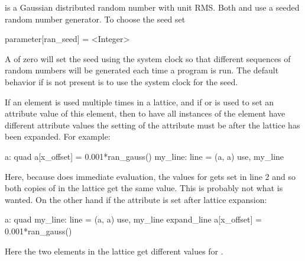  is a Gaussian distributed random number with unit RMS. 
Both  and  use a seeded random number generator. 
To choose the seed set 
\begin{example}
  parameter[ran_seed] = <Integer>
\end{example}
A  of zero will set the seed using the system clock so that
different sequences of random numbers will be generated each time a
program is run.  The default behavior if  is
not present is to use the system clock for the seed.

If an element is used multiple times in a lattice, and if  or
 is used to set an attribute value of this element, then
to have all instances of the element have different attribute values
the setting of the attribute must be after the lattice has been
expanded. For example:
\begin{example}
  a: quad 
  a[x_offset] = 0.001*ran_gauss()
  my_line: line = (a, a)
  use, my_line
\end{example}
Here, because \bmad does immediate evaluation, the 
values for  gets set in line 2 and so both copies of  in
the lattice get the same value. This is probably not what is wanted.
On the other hand if the attribute is set after lattice expansion:
\begin{example}
  a: quad 
  my_line: line = (a, a)
  use, my_line
  expand_line
  a[x_offset] = 0.001*ran_gauss()
\end{example}
Here the two  elements in the lattice get different values for
.

